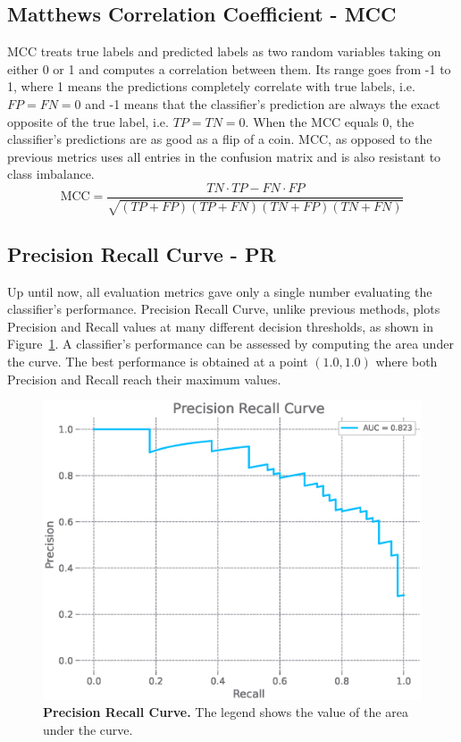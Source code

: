 \subsection{Matthews Correlation Coefficient - MCC}
\label{subsection:mcc}

MCC treats true labels and predicted labels as two random variables taking on either 0 or 1 and
computes a correlation between them. Its range goes from -1 to 1, where 1 means the predictions
completely correlate with true labels, i.e. $FP = FN = 0$ and -1 means that the classifier's
prediction are always the exact opposite of the true label, i.e. $TP = TN = 0$. When the MCC
equals 0, the classifier's predictions are as good as a flip of a coin. MCC, as opposed to the
previous metrics uses all entries in the confusion matrix and is also resistant to class imbalance.
\begin{equation}
    \mathrm{MCC} = \frac{TN \cdot TP - FN \cdot FP}{\sqrt{(TP + FP)(TP + FN)(TN + FP)(TN + FN)}}
\end{equation}


\subsection{Precision Recall Curve - PR}

Up until now, all evaluation metrics gave only a single number evaluating the classifier's
performance. Precision Recall Curve, unlike previous methods, plots Precision and Recall values at
many different decision thresholds, as shown in Figure~\ref{figure:pr-curve}. A classifier's
performance can be assessed by computing the area under the curve. The best performance is obtained
at a point $(1.0, 1.0)$ where both Precision and Recall reach their maximum values.

\begin{figure}
    \centering
    \includegraphics[width=0.75\linewidth]{figures/pr_curve.eps}
    \caption{
        \textbf{Precision Recall Curve.} The legend shows the value of the area under the curve.
    }
    \label{figure:pr-curve}
\end{figure}


